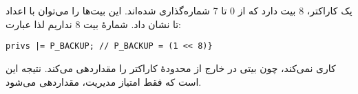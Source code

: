 \section{}
\paragraph{}\label{answer:11}
یک کاراکتر، 8 بیت دارد که از 0 تا 7 شماره‌گذاری شده‌اند. این بیت‌ها را می‌توان با اعداد  تا  نشان داد. شمارهٔ بیت 8 نداریم لذا عبارت:
\begin{LTR}
    \begin{lstlisting}[style=C++Style]
        privs |= P_BACKUP; // P_BACKUP = (1 << 8)}
    \end{lstlisting}
\end{LTR}

کاری نمی‌کند، چون بیتی در خارج از محدودهٔ کاراکتر را مقداردهی می‌کند. نتیجه این است که فقط امتیاز مدیریت، مقداردهی می‌شود.
